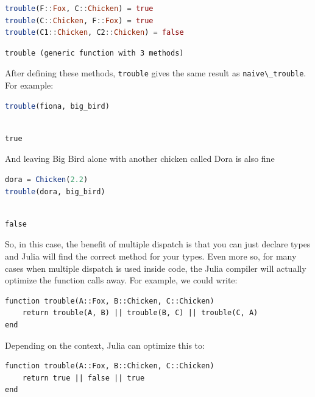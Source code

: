 \documentclass[
  notoc %
]{tufte-book}
\newcommand{\passthrough}[1]{#1}
\begin{document}
\begin{lstlisting}[language=Julia]
trouble(F::Fox, C::Chicken) = true
trouble(C::Chicken, F::Fox) = true
trouble(C1::Chicken, C2::Chicken) = false
\end{lstlisting}

\begin{lstlisting}[language=Output]
trouble (generic function with 3 methods)
\end{lstlisting}

After defining these methods, \passthrough{\lstinline!trouble!} gives
the same result as \passthrough{\lstinline!naive\_trouble!}. For
example:

\begin{lstlisting}[language=Julia]
trouble(fiona, big_bird)
\end{lstlisting}

\begin{lstlisting}[language=Output]

true

\end{lstlisting}

And leaving Big Bird alone with another chicken called Dora is also fine

\begin{lstlisting}[language=Julia]
dora = Chicken(2.2)
trouble(dora, big_bird)
\end{lstlisting}

\begin{lstlisting}[language=Output]

false

\end{lstlisting}

So, in this case, the benefit of multiple dispatch is that you can just
declare types and Julia will find the correct method for your types.
Even more so, for many cases when multiple dispatch is used inside code,
the Julia compiler will actually optimize the function calls away. For
example, we could write:

\begin{lstlisting}
function trouble(A::Fox, B::Chicken, C::Chicken)
    return trouble(A, B) || trouble(B, C) || trouble(C, A)
end
\end{lstlisting}

Depending on the context, Julia can optimize this to:

\begin{lstlisting}
function trouble(A::Fox, B::Chicken, C::Chicken)
    return true || false || true
end
\end{lstlisting}
\end{document}
